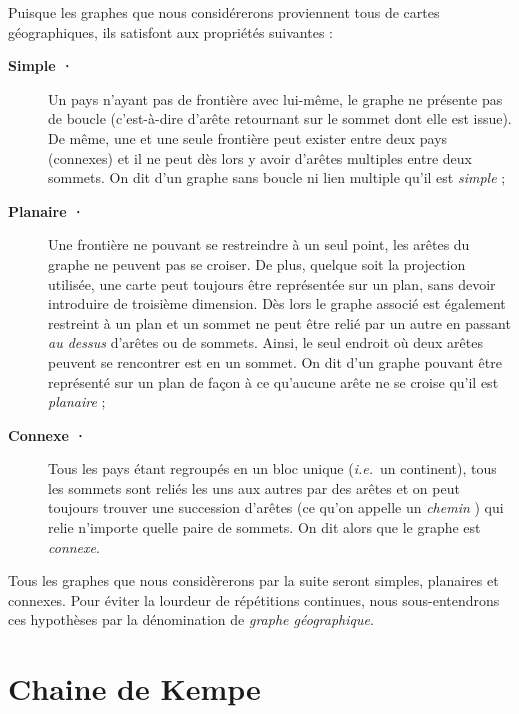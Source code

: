 \documentclass[french]{report}
\begin{document}
Puisque les graphes que nous considérerons proviennent tous de cartes géographiques, ils satisfont aux propriétés suivantes :
\begin{description}

\item[\textbf{Simple ·}] Un pays n'ayant pas de frontière avec lui-même, le graphe ne présente pas de boucle (c'est-à-dire d'arête retournant sur le sommet dont elle est issue). De même, une et une seule frontière peut exister entre deux pays (connexes) et il ne peut dès lors y avoir d'arêtes multiples entre deux sommets. On dit d'un graphe sans boucle ni lien multiple qu'il est \textit{simple} ;
\item[\textbf{Planaire ·}] Une frontière ne pouvant se restreindre à un seul point, les arêtes du graphe ne peuvent pas se croiser. De plus, quelque soit la projection utilisée, une carte peut toujours être représentée sur un plan, sans devoir introduire de troisième dimension. Dès lors le graphe associé est également restreint à un plan et un sommet ne peut être relié par un autre en passant \textit{au dessus} d'arêtes ou de sommets. Ainsi, le seul endroit où deux arêtes peuvent se rencontrer est en un sommet. On dit d'un graphe pouvant être représenté sur un plan de façon à ce qu'aucune arête ne se croise qu'il est \textit{planaire} ;
\item[\textbf{Connexe ·}] Tous les pays étant regroupés en un bloc unique (\textit{i.e.}~un continent), tous les sommets sont reliés les uns aux autres par des arêtes et on peut toujours trouver une succession d'arêtes (ce qu'on appelle un \textit{chemin}%
) qui relie n'importe quelle paire de sommets. On dit alors que le graphe est \textit{connexe}.
\end{description}
Tous les graphes que nous considèrerons par la suite seront simples, planaires et connexes. Pour éviter la lourdeur de répétitions continues, nous sous-entendrons ces hypothèses par la dénomination de \textit{graphe géographique}.

\section{Chaine de Kempe}
\end{document}
